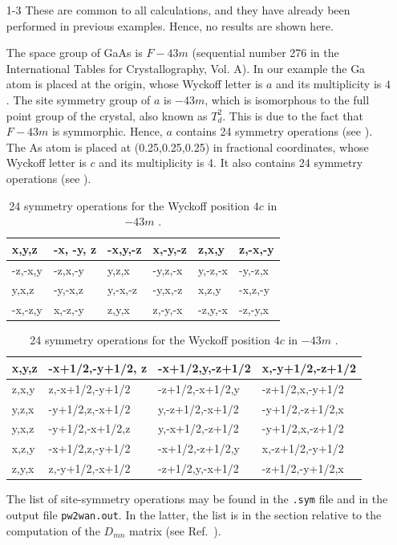 \begin{itemize}
	\item [1-3] These are common to all calculations, and they have already been performed in previous examples. Hence, no results are shown here.

The space group of GaAs is $F{-}43m$ (sequential  number 276 in the International Tables for Crystallography, Vol. A).
In our example the Ga atom is placed at the origin, whose Wyckoff letter is $a$ and its multiplicity is $4$. The site symmetry group of $a$ is ${-}43m$, which is isomorphous to the full point group of the crystal, also known as $T_d^2$. This is due to the fact that $F{-}43m$ is symmorphic. Hence, $a$ contains 24 symmetry operations (see ). The As atom is placed at (0.25,0.25,0.25) in fractional coordinates, whose Wyckoff letter is $c$ and its multiplicity is 4. It also contains 24 symmetry operations (see ).
\begin{table}[b!]
	\centering
	\captionsetup{width=.5\textwidth}
	\caption{24 symmetry operations for the Wyckoff position $4a$ in $-43m$ \cite{bilbaocrystserver}.}
	\begin{tabular}{@{} |l|l|l|l|l|l| @{}}\toprule[1.5pt]
	x,y,z & -x, -y, z & -x,y,-z & x,-y,-z & z,x,y & z,-x,-y \\
	\hline
	-z,-x,y & -z,x,-y & y,z,x & -y,z,-x & y,-z,-x & -y,-z,x \\
	\hline
	y,x,z & -y,-x,z & y,-x,-z & -y,x,-z & x,z,y & -x,z,-y \\
	\hline
	-x,-z,y & x,-z,-y & z,y,x & z,-y,-x & -z,y,-x & -z,-y,x \\
	\bottomrule[1pt]
	\end{tabular}\label{tab21.1}

	\centering
	\captionsetup{width=.5\textwidth}
	\caption{24 symmetry operations for the Wyckoff position $4c$ in $-43m$ \cite{bilbaocrystserver}.}
	\begin{tabular}{@{} |l|l|l|l| @{}}\toprule[1.5pt]
	x,y,z & -x+1/2,-y+1/2, z & -x+1/2,y,-z+1/2 & x,-y+1/2,-z+1/2  \\
	\hline
	z,x,y & z,-x+1/2,-y+1/2 & -z+1/2,-x+1/2,y & -z+1/2,x,-y+1/2  \\
	\hline
	y,z,x & -y+1/2,z,-x+1/2 & y,-z+1/2,-x+1/2 & -y+1/2,-z+1/2,x  \\
	\hline
	y,x,z & -y+1/2,-x+1/2,z & y,-x+1/2,-z+1/2 & -y+1/2,x,-z+1/2 \\
	\hline
	x,z,y & -x+1/2,z,-y+1/2 & -x+1/2,-z+1/2,y & x,-z+1/2,-y+1/2 \\
	\hline
	z,y,x & z,-y+1/2,-x+1/2 & -z+1/2,y,-x+1/2 & -z+1/2,-y+1/2,x \\
	\bottomrule[1pt]
	\end{tabular}\label{tab21.2}
\end{table}
The list of site-symmetry operations may be found in the {\tt .sym} file and in the output file {\tt pw2wan.out}. In the latter, the list is in the section relative to the computation of the $D_{mn}$ matrix (see Ref.~).
\end{itemize}
\clearpage


